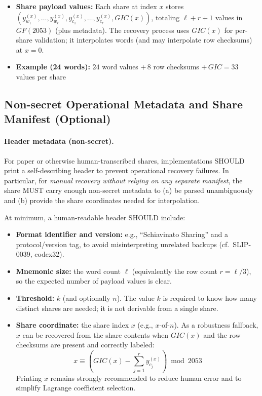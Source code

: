 \documentclass[11pt]{article}
\begin{document}
\begin{itemize}[noitemsep]
\begin{itemize}[noitemsep]
        \item \textbf{Transport Hash:} $H \in \{0, \ldots, 2^{128}-1\}$, defined as the first 16 bytes of $\text{SHA-256}(\text{HeaderBytes}\parallel B\parallel I\parallel \text{ShareDataBytes})$ under the reference encoding of Appendix~\ref{app:encoding}
    \end{itemize}
    The BIP32 Master Key Fingerprint $F$ is derived from $M$ and used only as the HMAC key; it is not stored in shares.
    \item \textbf{Share payload values:} Each share at index $x$ stores $(y_{w_1}^{(x)}, \ldots, y_{w_\ell}^{(x)}, y_{c_1}^{(x)}, \ldots, y_{c_r}^{(x)}, GIC(x))$, totaling $\ell + r + 1$ values in $GF(2053)$ (plus metadata). The recovery process uses $GIC(x)$ for per-share validation; it interpolates words (and may interpolate row checksums) at $x=0$.
    \item \textbf{Example (24 words):} $24$ word values $+\,8$ row checksums $+\,GIC = 33$ values per share
\end{itemize}

\subsection{Non-secret Operational Metadata and Share Manifest (Optional)}
\label{sec:manifest}

\paragraph{Header metadata (non-secret).}
For paper or otherwise human-transcribed shares, implementations SHOULD print a self-describing header to prevent operational recovery failures. In particular, for \emph{manual recovery without relying on any separate manifest}, the share MUST carry enough non-secret metadata to (a) be parsed unambiguously and (b) provide the share coordinates needed for interpolation.

At minimum, a human-readable header SHOULD include:
\begin{itemize}[noitemsep]
    \item \textbf{Format identifier and version:} e.g., ``Schiavinato Sharing'' and a protocol/version tag, to avoid misinterpreting unrelated backups (cf.\ SLIP-0039, codex32).
    \item \textbf{Mnemonic size:} the word count $\ell$ (equivalently the row count $r=\ell/3$), so the expected number of payload values is clear.
    \item \textbf{Threshold:} $k$ (and optionally $n$). The value $k$ is required to know how many distinct shares are needed; it is not derivable from a single share.
    \item \textbf{Share coordinate:} the share index $x$ (e.g., $x$-of-$n$). As a robustness fallback, $x$ can be recovered from the share contents when $GIC(x)$ and the row checksums are present and correctly labeled:
    \[
        x \equiv \left(GIC(x) - \sum_{j=1}^{r} y_{c_j}^{(x)}\right) \bmod 2053
    \]
    Printing $x$ remains strongly recommended to reduce human error and to simplify Lagrange coefficient selection.
\end{itemize}
\end{document}
